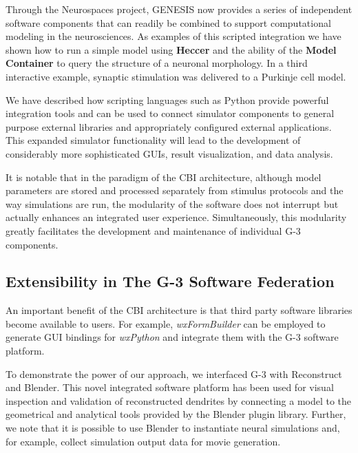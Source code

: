 \documentclass[10pt]{article}
\begin{document}
Through the Neurospaces
project, GENESIS now provides a series of independent software
components that can readily be combined to support computational
modeling in the neurosciences. As examples of this scripted integration we have shown how to run a
simple model using {\bf Heccer} and the ability of the {\bf
  Model Container} to query the structure of a neuronal morphology.
In a third interactive example, synaptic stimulation was delivered to
a Purkinje cell model.  

We have described how scripting
languages such as Python provide powerful integration tools
and can be used to connect simulator components to general purpose
external libraries and appropriately configured external applications.
This expanded simulator functionality will lead to the development of
considerably more sophisticated GUIs, result visualization, and data
analysis.

It is notable that in the paradigm of the CBI
architecture, although model parameters are stored and processed separately
from stimulus protocols and the way simulations are run, the modularity of the software does not interrupt but actually enhances an integrated user experience. Simultaneously, this
modularity greatly facilitates the development and maintenance of
individual G-3 components.

\subsection*{Extensibility in The G-3 Software Federation}

An important benefit of the CBI architecture is
that third party software libraries become available to users.  For
example, {\it wxFormBuilder} can be employed to generate GUI bindings for
{\it wxPython} and integrate them with the G-3 software platform.

To demonstrate the power of our approach, we
interfaced G-3 with Reconstruct and Blender. This novel integrated software
platform has been used for visual inspection and validation of
reconstructed dendrites by connecting a model to the geometrical and
analytical tools provided by the Blender plugin library.  Further, we
note that it is possible to use Blender to instantiate neural
simulations and, for example, collect simulation output data for
movie generation.  
\end{document}
